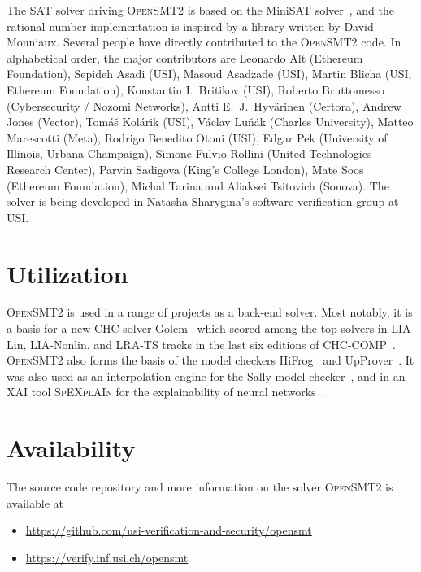 \documentclass{easychair}
\newcommand{\opensmt}{\textsc{OpenSMT2}\xspace}
\newcommand{\spexplain}{\textsc{S{\footnotesize{p}}EX{\footnotesize{pl}}AI{\footnotesize{n}}}\xspace}
\begin{document}
The SAT solver driving \opensmt is based on the MiniSAT
solver~\cite{EenS:SAT03}, and the rational number implementation is
inspired by a library written by David Monniaux.  Several people have
directly contributed to the \opensmt code.  In alphabetical order, the
major contributors are
%
Leonardo Alt (Ethereum Foundation),
Sepideh Asadi (USI),
Masoud Asadzade (USI),
Martin Blicha (USI, Ethereum Foundation),
Konstantin I.~Britikov (USI),
Roberto Bruttomesso (Cybersecurity / Nozomi Networks),
Antti E.~J.~Hyv{\"a}rinen (Certora),
Andrew Jones (Vector),
Tomáš Kolárik (USI),
Václav Luňák (Charles University),
Matteo Marescotti (Meta),
Rodrigo Benedito Otoni (USI),
Edgar Pek (University of Illinois, Urbana-Champaign),
Simone Fulvio Rollini (United Technologies Research Center),
Parvin Sadigova (King's College London),
Mate Soos (Ethereum Foundation),
Michal Tarina
and Aliaksei Tsitovich (Sonova).
%
The solver is being developed in Natasha Sharygina's software
verification group at USI.

\section{Utilization}

\opensmt is used in a range of projects as a back-end solver.
Most notably, it is a basis for a new CHC solver Golem~\cite{BlichaBS:CAV23} which scored among the top solvers
in LIA-Lin, LIA-Nonlin, and LRA-TS tracks in the last six editions of CHC-COMP~\cite{Rummer_2020,Rummer_2021,De_Angelis_2022,CHC-COMP23,CHC-COMP24,CHC-COMP25}.
\opensmt also forms the basis of the model checkers HiFrog~\cite{AltACMFHS17} and
UpProver~\cite{Asadi_2020b}.
It was also used as an interpolation engine for the Sally model
checker~\cite{JovanovicD:FMCAD16},
and in an XAI tool \spexplain{} for the explainability of neural networks~\cite{spaceExplanation}.

\section{Availability}
The source code repository and more information on the solver \opensmt is
available at

\begin{itemize}
    \item \url{https://github.com/usi-verification-and-security/opensmt}
    \item \url{https://verify.inf.usi.ch/opensmt}
\end{itemize}
\end{document}
